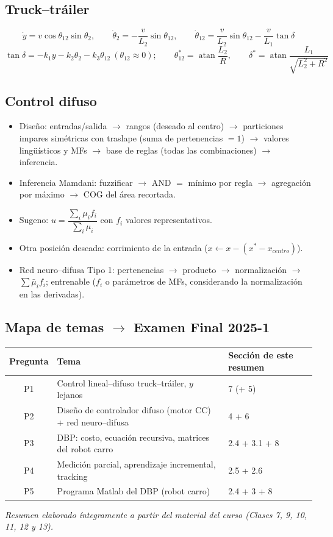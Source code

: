 \documentclass[11pt,a4paper]{article}
\begin{document}
\subsection*{Truck--tráiler}
\[
\dot y=v\cos\theta_{12}\sin\theta_2,\qquad
\dot\theta_2=-\frac{v}{L_2}\sin\theta_{12},\qquad
\dot\theta_{12}=\frac{v}{L_2}\sin\theta_{12}-\frac{v}{L_1}\tan\delta
\]
\[
\tan\delta=-k_1y-k_2\theta_2-k_3\theta_{12}\ (\theta_{12}\approx0);
\qquad
\theta_{12}^{*}=\operatorname{atan}\frac{L_2}{R},\qquad
\delta^{*}=\operatorname{atan}\frac{L_1}{\sqrt{L_2^2+R^2}}
\]

\subsection*{Control difuso}
\begin{itemize}[itemsep=1pt]
\item Diseño: entradas/salida $\to$ rangos (deseado al centro) $\to$ particiones impares simétricas con traslape (suma de pertenencias $=1$) $\to$ valores lingüísticos y MFs $\to$ base de reglas (todas las combinaciones) $\to$ inferencia.
\item Inferencia Mamdani: fuzzificar $\to$ AND $=$ mínimo por regla $\to$ agregación por máximo $\to$ COG del área recortada.
\item Sugeno: $u=\dfrac{\sum_i\mu_i f_i}{\sum_i\mu_i}$ con $f_i$ valores representativos.
\item Otra posición deseada: corrimiento de la entrada ($x\leftarrow x-(x^{*}-x_{centro})$).
\item Red neuro--difusa Tipo 1: pertenencias $\to$ producto $\to$ normalización $\to$ $\sum\bar\mu_if_i$; entrenable ($f_i$ o parámetros de MFs, considerando la normalización en las derivadas).
\end{itemize}

\subsection*{Mapa de temas $\to$ Examen Final 2025-1}
\begin{center}
\small
\begin{tabular}{c l l}
\toprule
Pregunta & Tema & Sección de este resumen\\
\midrule
P1 & Control lineal--difuso truck--tráiler, $y$ lejanos & 7 (+ 5)\\
P2 & Diseño de controlador difuso (motor CC) + red neuro--difusa & 4 + 6\\
P3 & DBP: costo, ecuación recursiva, matrices del robot carro & 2.4 + 3.1 + 8\\
P4 & Medición parcial, aprendizaje incremental, tracking & 2.5 + 2.6\\
P5 & Programa Matlab del DBP (robot carro) & 2.4 + 3 + 8\\
\bottomrule
\end{tabular}
\end{center}

\vspace{10pt}
\begin{center}
\small\itshape Resumen elaborado íntegramente a partir del material del curso (Clases 7, 9, 10, 11, 12 y 13).
\end{center}
\end{document}
